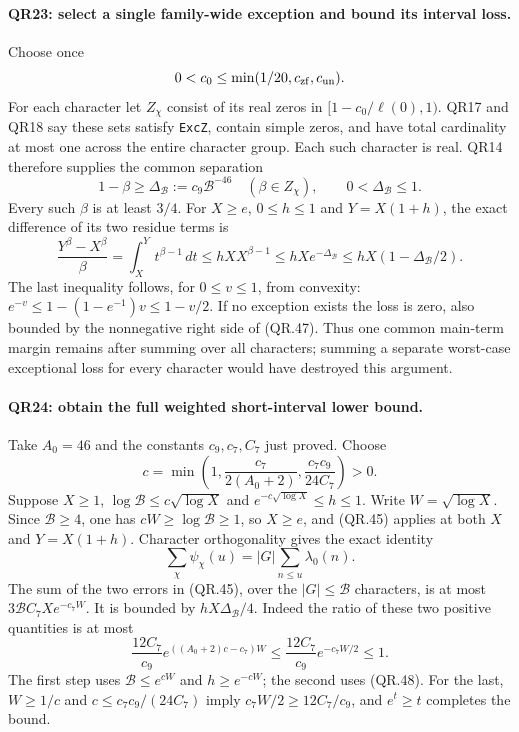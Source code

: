 \paragraph{QR23: select a single family-wide exception and bound its interval loss.}
Choose once
\[
 0<c_0\le\min(1/20,c_{\rm zf},c_{\rm un}).
\]
For each character let $Z_\chi$ consist of its real zeros in
$[1-c_0/\ell(0),1)$. QR17 and QR18 say these sets satisfy
\texttt{ExcZ}, contain simple zeros, and have total cardinality
at most one across the entire character group. Each such character
is real. QR14 therefore supplies the common separation
\[
       1-\beta\ge\Delta_{\mathcal B}:=c_9\mathcal B^{-46}
           \quad(\beta\in Z_\chi),\qquad0<\Delta_{\mathcal B}\le1.
                                                               \tag{QR.46}
\]
Every such $\beta$ is at least $3/4$.
For $X\ge e$, $0\le h\le1$ and $Y=X(1+h)$, the exact difference
of its two residue terms is
\[
 \frac{Y^\beta-X^\beta}{\beta}
       =\int_X^Y t^{\beta-1}\,dt
       \le hX X^{\beta-1}
       \le hX e^{-\Delta_{\mathcal B}}
       \le hX(1-\Delta_{\mathcal B}/2).                   \tag{QR.47}
\]
The last inequality follows, for $0\le v\le1$, from convexity:
$e^{-v}\le1-(1-e^{-1})v\le1-v/2$.
If no exception exists the loss is zero, also bounded by the
nonnegative right side of (QR.47). Thus one common main-term
margin remains after summing over all characters; summing a separate
worst-case exceptional loss for every character would have destroyed
this argument.

\paragraph{QR24: obtain the full weighted short-interval lower bound.}
Take $A_0=46$ and the constants $c_9,c_7,C_7$ just proved. Choose
\[
 c=\min\left(1,\frac{c_7}{2(A_0+2)},
                          \frac{c_7c_9}{24C_7}\right)>0.  \tag{QR.48}
\]
Suppose $X\ge1$, $\log\mathcal B\le c\sqrt{\log X}$ and
$e^{-c\sqrt{\log X}}\le h\le1$. Write $W=\sqrt{\log X}$.
Since $\mathcal B\ge4$, one has $cW\ge\log\mathcal B\ge1$,
so $X\ge e$, and (QR.45) applies at both $X$ and $Y=X(1+h)$.
Character orthogonality gives the exact identity
\[
       \sum_\chi\psi_\chi(u)=|G|\sum_{n\le u}\lambda_0(n).
                                                               \tag{QR.49}
\]
The sum of the two errors in (QR.45), over the $|G|\le\mathcal B$
characters, is at most $3\mathcal B C_7X e^{-c_7W}$.
It is bounded by $hX\Delta_{\mathcal B}/4$. Indeed the ratio
of these two positive quantities is at most
\[
 \frac{12C_7}{c_9}
       e^{((A_0+2)c-c_7)W}
 \le\frac{12C_7}{c_9}e^{-c_7W/2}\le1.                   \tag{QR.50}
\]
The first step uses $\mathcal B\le e^{cW}$ and $h\ge e^{-cW}$;
the second uses (QR.48). For the last, $W\ge1/c$ and
$c\le c_7c_9/(24C_7)$ imply
$c_7W/2\ge12C_7/c_9$, and $e^t\ge t$ completes the bound.

